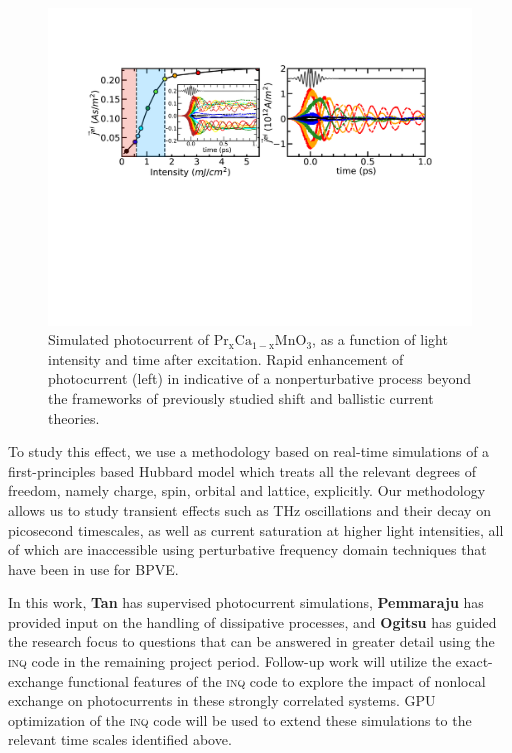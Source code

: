 \begin{figure}[ht]
    \centering\includegraphics[width=1.0\linewidth]{figures/photocurrent_old}
    \caption{
        Simulated photocurrent of \(\mathrm{Pr_xCa_{1-x}MnO_3}\), as a function of light intensity and time after excitation. 
        Rapid enhancement of photocurrent (left) in indicative of a nonperturbative process beyond the frameworks of previously studied shift and ballistic current theories.
    }
    \label{fig:PCMO}
\end{figure}

To study this effect, we use a methodology based on real-time simulations of a first-principles based Hubbard model which treats all the relevant degrees of freedom, namely charge, spin, orbital and lattice, explicitly. 
Our methodology allows us to study transient effects such as THz oscillations and their decay on picosecond timescales, as well as current saturation at higher light intensities, all of which are inaccessible using perturbative frequency domain techniques that have been in use for BPVE. 

In this work, {\bf Tan} has supervised photocurrent simulations, {\bf Pemmaraju} has provided input on the handling of dissipative processes, and {\bf Ogitsu} has guided the research focus to questions that can be answered in greater detail using the \textsc{inq} code in the remaining project period. 
Follow-up work will utilize the exact-exchange functional features of the \textsc{inq} code to explore the impact of nonlocal exchange on photocurrents in these strongly correlated systems. GPU optimization of the \textsc{inq} code will be used to extend these simulations to the relevant time scales identified above.  

